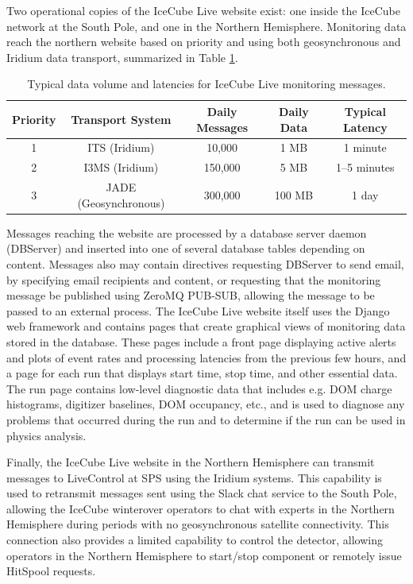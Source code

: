 Two operational copies of the IceCube Live website exist: one inside the
IceCube network at the South Pole, and one in the Northern Hemisphere.
Monitoring data reach the northern website based on priority and using
both geosynchronous and Iridium data transport, summarized in Table
\ref{i3messages}.

\begin{table}[!ht]
\begin{tabular}{|c|c|c|c|c|}
\hline Priority & Transport System & Daily Messages & Daily Data & Typical
Latency\\ \hline 1 & ITS (Iridium) & 10,000 & 1 MB & 1 minute \\ \hline 2 &
I3MS (Iridium) & 150,000 & 5 MB & 1--5 minutes \\ \hline 3 & JADE
(Geosynchronous) & 300,000 & 100 MB & 1 day \\ \hline
\end{tabular}
\caption{Typical data volume and latencies for IceCube Live monitoring
  messages.} 
\label{i3messages}
\end{table}

Messages reaching the website are processed by a database server daemon
(DBServer) and inserted into one of several database tables depending on content.
Messages also may contain directives requesting DBServer to send email, by
specifying email recipients and content, or requesting that the monitoring
message be published using ZeroMQ PUB-SUB, allowing the message to be
passed to an external process.  The IceCube Live website itself uses the
Django web framework and contains pages that create graphical views of
monitoring data stored in the database.  These pages include a front page
displaying active alerts and plots of event rates and processing latencies
from the previous few hours, and a page for each run that displays start
time, stop time, and other essential data.  The run page contains low-level
diagnostic data that includes e.g. DOM charge histograms, digitizer baselines,
DOM occupancy, etc., and is used to diagnose any problems that occurred
during the run and to determine if the run can be used in physics analysis.

Finally, the IceCube Live website in the Northern Hemisphere can transmit
messages to LiveControl at SPS using the Iridium systems.  This capability
is used to retransmit messages sent using the Slack chat service to the
South Pole, allowing the IceCube winterover operators to chat with experts in the
Northern Hemisphere during periods with no geosynchronous satellite
connectivity.  This connection also provides a limited capability to
control the detector, allowing operators in the Northern Hemisphere to
start/stop component or remotely issue HitSpool requests.

